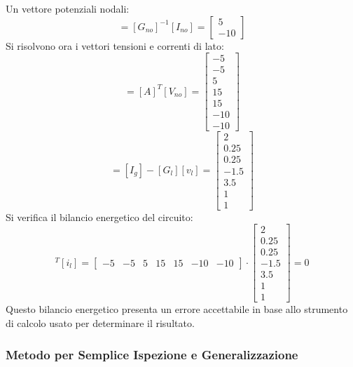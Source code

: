 \documentclass{article}
\numberwithin{equation}{subsection}
\begin{document}
Un vettore potenziali nodali:
\begin{equation*}
    [V_{no}]=[G_{no}]^{-1}[I_{no}]=\begin{bmatrix}
        5\\
        -10
    \end{bmatrix}
\end{equation*}
Si risolvono ora i vettori tensioni e correnti di lato:
\begin{equation*}
    [v_l]=[A]^T[V_{no}]=\begin{bmatrix}
        -5\\
        -5\\
        5\\
        15\\
        15\\
        -10\\
        -10
    \end{bmatrix}
\end{equation*}
\begin{equation*}
    [i_l]=[I_g]-[G_l][v_l]=\begin{bmatrix}
        2\\
        0.25\\
        0.25\\
        -1.5\\
        3.5\\
        1\\
        1
    \end{bmatrix}
\end{equation*}
Si verifica il bilancio energetico del circuito:
\begin{equation*}
    [v_l]^T[i_l]=\begin{bmatrix}
        -5&
        -5&
        5&
        15&
        15&
        -10&
        -10
    \end{bmatrix}\cdot\begin{bmatrix}
        2\\
        0.25\\
        0.25\\
        -1.5\\
        3.5\\
        1\\
        1
    \end{bmatrix}
    =0
\end{equation*}
Questo bilancio energetico presenta un errore accettabile in base allo strumento di calcolo usato per determinare il risultato. 

\subsubsection{Metodo per Semplice Ispezione e Generalizzazione}
\end{document}
